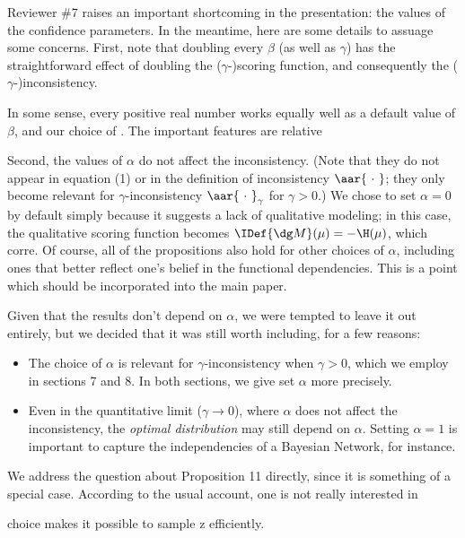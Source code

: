 Reviewer \#7 raises an important shortcoming in the presentation: the values of the confidence parameters. In the meantime, here are some details to assuage some concerns.
First, note that doubling every $\beta$ (as well as $\gamma$) has the straightforward effect of doubling the ($\gamma$-)scoring function, and consequently the ($\gamma$-)inconsistency.

In some sense, every positive real number works equally well as a default value of $\beta$, and our choice of . The important features are relative


Second, the values of $\alpha$ do not affect the inconsistency. (Note that they do not appear in equation (1) or in the definition of inconsistency $\aar{~\cdot~}$; they only become relevant for $\gamma$-inconsistency $\aar{~\cdot~}_\gamma$ for $\gamma > 0$.)
We chose to set $\alpha=0$ by default simply because it suggests a lack of qualitative modeling; in this case, the qualitative scoring function becomes $\IDef{\dg M}(\mu) = -\H(\mu)$, which corre.
Of course, all of the propositions also hold for other choices of $\alpha$, including ones that better reflect one's belief in the functional dependencies.  This is a point which should be incorporated into the main paper.


Given that the results don’t depend on  $\alpha$, we were tempted to leave it out entirely, but we decided that it was still worth including, for a few reasons:
\begin{itemize}
    \item The choice of $\alpha$ is relevant for $\gamma$-inconsistency when $\gamma > 0$, which we employ in sections 7 and 8. In both sections, we give set $\alpha$ more precisely.
    \item Even in the quantitative limit ($\gamma \to 0$), where $\alpha$ does not affect the inconsistency, the \emph{optimal distribution} may still depend on $\alpha$. Setting $\alpha=1$ is important to capture the independencies of a Bayesian Network, for instance.
\end{itemize}


We address the question about Proposition 11 directly, since it is something of a special case.
According to the usual account, one is not really interested in


choice makes it possible to sample z efficiently.

